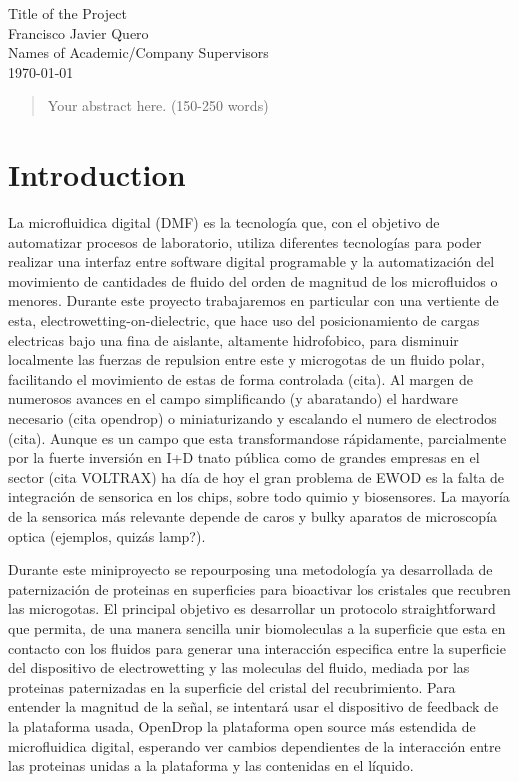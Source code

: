 \documentclass[12pt]{article}
\begin{document}
\begin{titlepage}
    \centering
    \vspace*{60px}
    \huge{Title of the Project}\\
    \vspace{10px}
    \large{Francisco Javier Quero}\\
    \large{Names of Academic/Company Supervisors}\\
    \vfill
    \today
    \vfill
\end{titlepage}

\newpage
\begin{abstract}
\noindent
Your abstract here. (150-250 words)
\end{abstract}

\newpage
\section*{Introduction}

La microfluidica digital (DMF) es la tecnología que, con el objetivo de automatizar procesos de laboratorio, utiliza
diferentes tecnologías para poder realizar una interfaz entre software digital programable y la automatización del 
movimiento de cantidades de fluido del orden de magnitud de los microfluidos o menores. Durante este proyecto trabajaremos
en particular con una vertiente de esta, electrowetting-on-dielectric, que hace uso del posicionamiento de cargas electricas bajo una fina de aislante, altamente hidrofobico, para disminuir localmente las fuerzas de repulsion entre este y microgotas de un fluido polar, facilitando
el movimiento de estas de forma controlada (cita). Al margen de numerosos avances en el campo simplificando (y abaratando) el hardware necesario (cita opendrop) o miniaturizando y escalando el numero de electrodos (cita). Aunque es un campo que esta transformandose rápidamente,
parcialmente por la fuerte inversión en I+D tnato pública como de grandes empresas en el sector (cita VOLTRAX) ha día de hoy el gran problema 
de EWOD es la falta de integración de sensorica en los chips, sobre todo quimio y biosensores. La mayoría de la sensorica más relevante depende
de caros y bulky aparatos de microscopía optica (ejemplos, quizás lamp?).

Durante este miniproyecto se repourposing una metodología ya desarrollada de paternización de proteinas en superficies para bioactivar los cristales que recubren las microgotas. El principal objetivo es desarrollar un protocolo straightforward que permita, de una manera sencilla unir biomoleculas a la superficie que esta en contacto con los fluidos para generar una interacción especifica entre la superficie del dispositivo de electrowetting y las moleculas del fluido, mediada por las proteinas paternizadas en la superficie del cristal del recubrimiento. Para entender la magnitud de la señal, se intentará usar el dispositivo de feedback de la plataforma usada, OpenDrop la plataforma open source más estendida de microfluidica digital, esperando ver cambios dependientes de la interacción entre las proteinas unidas a la plataforma y las contenidas en el líquido.
\end{document}
